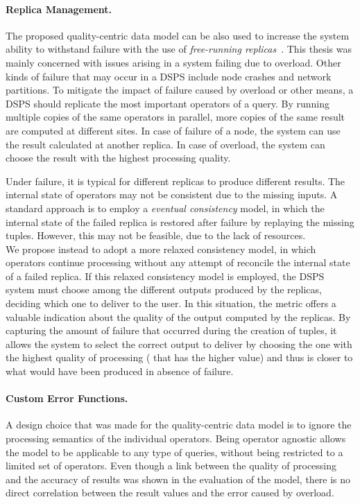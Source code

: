 \paragraph{Replica Management.}
The proposed quality-centric data model can be also used to increase the system ability to withstand
failure with the use of \emph{free-running replicas}~\cite{dependable-is-sensing}. This thesis was mainly
concerned with issues arising in a system failing due to overload. Other kinds of failure that may occur
in a DSPS include node crashes and network partitions. To mitigate the impact of failure caused by
overload or other means, a DSPS should replicate the most important operators of a query. By running
multiple copies of the same operators in parallel, more copies of the same result are computed at
different sites. In case of failure of a node, the system can use the result calculated at another
replica. In case of overload, the system can choose the result with the highest processing quality.

Under failure, it is typical for different replicas to produce different results. The internal state
of operators may not be consistent due to the missing inputs. A standard approach is to employ a
\emph{eventual consistency} model, in which the internal state of the failed replica is restored after
failure by replaying the missing tuples. However, this may not be feasible, due to
the lack of resources.\\
We propose instead to adopt a more relaxed consistency model, in which operators continue processing
without any attempt of reconcile the internal state of a failed replica.
If this relaxed consistency model is employed, the DSPS system must choose among the different outputs
produced by the replicas, deciding which one to deliver to the user. In this situation, the \sic
metric offers a valuable indication about the quality of the output computed by the replicas. By
capturing the amount of failure that occurred during the creation of tuples, it allows the system to
select the correct output to deliver by choosing the one with the highest quality of processing (\ie
that has the higher \sic value) and thus is closer to what would have been produced in absence of
failure.
\vspace{-10pt}
\paragraph{Custom Error Functions.}
A design choice that was made for the quality-centric data model is to ignore the processing semantics of
the individual operators. Being operator agnostic allows the model to be applicable to any type of
queries, without being restricted to a limited set of operators. Even though a link between the quality of
processing and the accuracy of results was shown in the evaluation of the model, there is no direct
correlation between the result \sic values and the error caused by overload.


